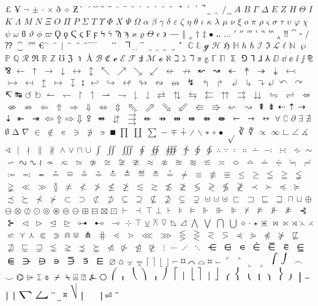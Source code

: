﻿%
$£$
$¥$
$¬$
$±$
$·$
$×$
$ð$
$÷$
$Ƶ$
$̀$
$́$
$̂$
$̂$
$̃$
$̃$
$̄$
$̅$
$̆$
$̇$
$̈$
$̉$
$̊$
$̌$
$̐$
$̒$
$̕$
$̚$
$̰$
$̲$
$̸$
$͍$
$Α$
$Β$
$Γ$
$Δ$
$Ε$
$Ζ$
$Η$
$Θ$
$Ι$
$Κ$
$Λ$
$Μ$
$Ν$
$Ξ$
$Ο$
$Π$
$Ρ$
$Σ$
$Τ$
$Υ$
$Φ$
$Χ$
$Ψ$
$Ω$
$α$
$β$
$γ$
$δ$
$ε$
$ζ$
$η$
$θ$
$ι$
$κ$
$λ$
$μ$
$ν$
$ξ$
$ο$
$π$
$ρ$
$ς$
$σ$
$τ$
$υ$
$φ$
$χ$
$ψ$
$ω$
$ϐ$
$ϑ$
$ϕ$
$ϖ$
$Ϙ$
$ϙ$
$Ϛ$
$ϛ$
$Ϝ$
$ϝ$
$Ϟ$
$ϟ$
$Ϡ$
$ϡ$
$ϰ$
$ϱ$
$ϴ$
$ϵ$
$϶$
$―$
$‖$
$‗$
$†$
$‡$
$•$
$‥$
$…$
$′$
$″$
$‴$
$‵$
$‶$
$‷$
$‸$
$‼$
$⁀$
$⁃$
$⁄$
$⁇$
$⁐$
$⁗$
$€$
$⃐$
$⃑$
$⃒$
$⃖$
$⃗$
$⃗$
$⃛$
$⃜$
⃝$ $
⃞$ $
⃟$ $
$⃡$
⃤$ $
$⃧$
$⃨$
$⃩$
$⃬$
$⃭$
$⃮$
$⃯$
$⃰$
$ℂ$
$ℇ$
$ℊ$
$ℋ$
$ℌ$
$ℍ$
$ℎ$
$ℏ$
$ℐ$
$ℑ$
$ℒ$
$ℓ$
$ℕ$
$℘$
$ℙ$
$ℚ$
$ℛ$
$ℜ$
$ℝ$
$ℤ$
$℧$
$ℨ$
$℩$
$Å$
$ℬ$
$ℭ$
$ℯ$
$ℰ$
$ℱ$
$Ⅎ$
$ℳ$
$ℴ$
$ℵ$
$ℶ$
$ℷ$
$ℸ$
$ℼ$
$ℽ$
$ℾ$
$ℿ$
$⅀$
$⅁$
$⅂$
$⅃$
$⅄$
$ⅅ$
$ⅆ$
$ⅇ$
$ⅈ$
$ⅉ$
$⅊$
$⅋$
$←$
$↑$
$→$
$↓$
$↔$
$↕$
$↖$
$↗$
$↘$
$↙$
$↚$
$↛$
$↜$
$↝$
$↞$
$↟$
$↠$
$↡$
$↢$
$↣$
$↤$
$↥$
$↦$
$↧$
$↨$
$↩$
$↪$
$↫$
$↬$
$↭$
$↮$
$↯$
$↰$
$↱$
$↲$
$↳$
$↴$
$↵$
$↶$
$↷$
$↸$
$↹$
$↺$
$↻$
$↼$
$↽$
$↾$
$↿$
$⇀$
$⇁$
$⇂$
$⇃$
$⇄$
$⇅$
$⇆$
$⇇$
$⇈$
$⇉$
$⇊$
$⇋$
$⇌$
$⇍$
$⇎$
$⇏$
$⇐$
$⇑$
$⇒$
$⇓$
$⇔$
$⇕$
$⇖$
$⇗$
$⇘$
$⇙$
$⇚$
$⇛$
$⇜$
$⇝$
$⇞$
$⇟$
$⇠$
$⇡$
$⇢$
$⇣$
$⇤$
$⇥$
$⇦$
$⇧$
$⇨$
$⇩$
$⇪$
$⇴$
$⇵$
$⇶$
$⇷$
$⇸$
$⇹$
$⇺$
$⇻$
$⇼$
$⇽$
$⇾$
$⇿$
$∀$
$∁$
$∂$
$∃$
$∄$
$∅$
$∆$
$∇$
$∈$
$∉$
$∊$
$∋$
$∌$
$∍$
$∎$
$∏$
$∐$
$∑$
$−$
$∓$
$∔$
$∕$
$∖$
$∗$
$∘$
$∙$
$√$
$∛$
$∜$
$∝$
$∞$
$∟$
$∠$
$∡$
$∢$
$∣$
$∤$
$∥$
$∦$
$∧$
$∨$
$∩$
$∪$
$∫$
$∬$
$∭$
$∮$
$∯$
$∰$
$∱$
$∲$
$∳$
$∴$
$∵$
$∶$
$∷$
$∸$
$∹$
$∺$
$∻$
$∼$
$∽$
$∾$
$∿$
$≀$
$≁$
$≂$
$≃$
$≄$
$≅$
$≆$
$≇$
$≈$
$≉$
$≊$
$≋$
$≌$
$≍$
$≎$
$≏$
$≐$
$≑$
$≒$
$≓$
$≔$
$≕$
$≖$
$≗$
$≘$
$≙$
$≚$
$≛$
$≜$
$≝$
$≞$
$≟$
$≠$
$≡$
$≢$
$≣$
$≤$
$≥$
$≦$
$≧$
$≨$
$≩$
$≪$
$≫$
$≬$
$≭$
$≮$
$≯$
$≰$
$≱$
$≲$
$≳$
$≴$
$≵$
$≶$
$≷$
$≸$
$≹$
$≺$
$≻$
$≼$
$≽$
$≾$
$≿$
$⊀$
$⊁$
$⊂$
$⊃$
$⊄$
$⊅$
$⊆$
$⊇$
$⊈$
$⊉$
$⊊$
$⊋$
$⊌$
$⊍$
$⊎$
$⊏$
$⊐$
$⊑$
$⊒$
$⊓$
$⊔$
$⊕$
$⊖$
$⊗$
$⊘$
$⊙$
$⊚$
$⊛$
$⊜$
$⊝$
$⊞$
$⊟$
$⊠$
$⊡$
$⊢$
$⊣$
$⊤$
$⊥$
$⊦$
$⊧$
$⊨$
$⊩$
$⊪$
$⊫$
$⊬$
$⊭$
$⊮$
$⊯$
$⊰$
$⊱$
$⊲$
$⊳$
$⊴$
$⊵$
$⊶$
$⊷$
$⊸$
$⊹$
$⊺$
$⊻$
$⊼$
$⊽$
$⊾$
$⊿$
$⋀$
$⋁$
$⋂$
$⋃$
$⋄$
$⋅$
$⋆$
$⋇$
$⋈$
$⋉$
$⋊$
$⋋$
$⋌$
$⋍$
$⋎$
$⋏$
$⋐$
$⋑$
$⋒$
$⋓$
$⋔$
$⋕$
$⋖$
$⋗$
$⋘$
$⋙$
$⋚$
$⋛$
$⋜$
$⋝$
$⋞$
$⋟$
$⋠$
$⋡$
$⋢$
$⋣$
$⋤$
$⋥$
$⋦$
$⋧$
$⋨$
$⋩$
$⋪$
$⋫$
$⋬$
$⋭$
$⋮$
$⋯$
$⋰$
$⋱$
$⋲$
$⋳$
$⋴$
$⋵$
$⋶$
$⋷$
$⋸$
$⋹$
$⋺$
$⋻$
$⋼$
$⋽$
$⋾$
$⋿$
$⌀$
$⌂$
$⌅$
$⌆$
$⌈$
$⌉$
$⌊$
$⌋$
$⌐$
$⌑$
$⌒$
$⌓$
$⌗$
$⌙$
$⌜$
$⌝$
$⌞$
$⌟$
$⌠$
$⌡$
$⌢$
$⌣$
$⌬$
$⌲$
$⌶$
$⌽$
$⌿$
$⍀$
$⍓$
$⍰$
$⍼$
$⎔$
$⎛$
$⎜$
$⎝$
$⎞$
$⎟$
$⎠$
$⎡$
$⎢$
$⎣$
$⎤$
$⎥$
$⎦$
$⎧$
$⎨$
$⎩$
$⎪$
$⎫$
$⎬$
$⎭$
$⎮$
$⎯$
$⎰$
$⎱$
$⎲$
$⎳$
$⎴$
$⎵$
$⎶$
$⎷$
$⎸$
$⎹$
$⏎$
$⏜$
